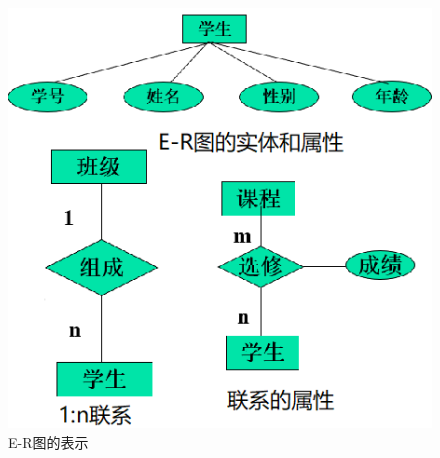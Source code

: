 \documentclass[chapter.computer_science.tex]{subfiles}
\begin{document}
\begin{figure}[H]
    \centering
    \includegraphics[scale=0.75]{./images/0019.png}
    \caption{E-R图的表示}
\end{figure}
\end{document}
